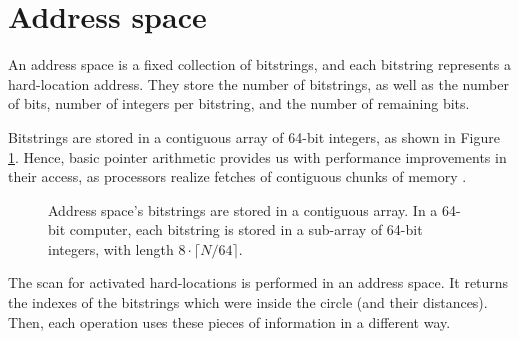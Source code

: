 \section{Address space}

An address space is a fixed collection of bitstrings, and each bitstring represents a hard-location address. They store the number of bitstrings, as well as the number of bits, number of integers per bitstring, and the number of remaining bits.

Bitstrings are stored in a contiguous array of 64-bit integers, as shown in Figure \ref{tab:hl-addresses-detail}. Hence, basic pointer arithmetic provides us with performance improvements in their access, as processors realize fetches of contiguous chunks of memory  \citep{pai2004linux}.

\begin{figure}
\centering
{}

\caption{Address space's bitstrings are stored in a contiguous array. In a 64-bit computer, each bitstring is stored in a sub-array of 64-bit integers, with length $8 \cdot \lceil N/64 \rceil$.\label{tab:hl-addresses-detail}}
\end{figure}

The scan for activated hard-locations is performed in an address space. It returns the indexes of the bitstrings which were inside the circle (and their distances). Then, each operation uses these pieces of information in a different way.

